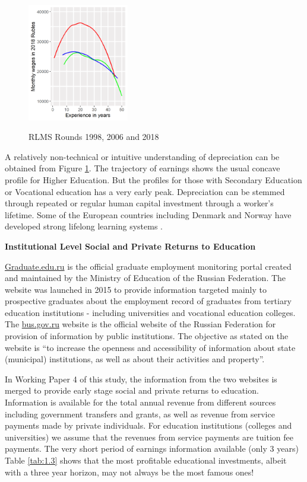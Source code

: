 \documentclass[alpha-refs]{wiley-article-04t}
\begin{document}
\begin{figure}[htbp!]
\begin{minipage}[b]{.3\linewidth}
		\hspace*{-0.7in}
		\includegraphics[width=125pt]{dp01_18.png}
		\label{fig:1.2c}
	\end{minipage}
	\caption{RLMS Rounds 1998, 
		2006 and 2018}\label{fig:1.2}
\end{figure}

 A relatively non-technical or 
intuitive understanding of depreciation can be 
obtained from Figure \ref{fig:1.2}. The trajectory of earnings shows the 
usual 
concave profile for Higher Education. But the profiles for those with 
Secondary Education or Vocational education has a very early peak. 
Depreciation can be stemmed through  
repeated or regular human capital investment through a worker's lifetime. 
Some of the European countries including Denmark and Norway have developed 
strong lifelong learning systems 
\parencite{jorgensen2007,midtsundstad2019}. 

\hspace{-1.75em} \textbf{Institutional Level Social and Private Returns to 
Education}

\url{Graduate.edu.ru} is the official graduate employment monitoring portal 
created and maintained by the Ministry of Education of the Russian 
Federation. The website was launched in 2015 to provide information 
targeted mainly to prospective graduates about the employment record of 
graduates from tertiary education institutions - including universities and 
vocational education colleges. The \url{bus.gov.ru} website is the official 
website of the Russian Federation for provision of information by public 
institutions. The objective as stated on the website is ``to increase the 
openness and accessibility of information about state (municipal) 
institutions, as well as about their activities and property''. 

In Working Paper 4 of this study, the information from the two websites is 
merged to provide early stage social and private returns to education.  
Information is available for the total annual revenue from different 
sources including government transfers and grants, as well as revenue from 
service payments made by private individuals. For education institutions 
(colleges and universities) we assume that the revenues from service 
payments are tuition fee payments. The very short period of earnings 
information available (only 3 years) Table \ref{tab:1.3} shows 
that the most profitable educational investments, albeit with a three year 
horizon, may not always be the most famous ones! 
\end{document}
